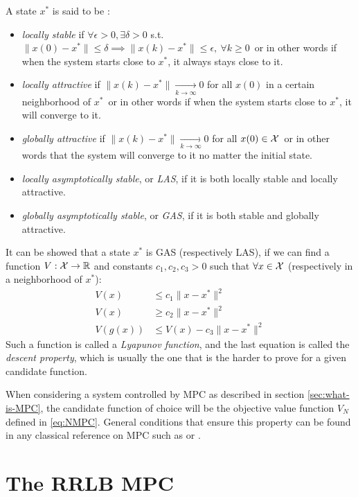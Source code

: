 \documentclass[12pt]{article}
\begin{document}
\noindent A state $x^*$ is said to be :
\begin{itemize}[label=\textbullet]
	\item \textit{locally stable} if $\forall\epsilon>0,\exists \delta>0$ s.t. $\|x(0)-x^*\|\leq\delta\implies\|x(k)-x^*\|\leq\epsilon,~\forall k\geq 0$\, or in other words if when the system starts close to $x^*$, it always stays close to it.
	\item \textit{locally attractive} if $\|x(k)-x^*\|\underset{k\to\infty}{\longrightarrow}0$ for all $x(0)$ in a certain neighborhood of $x^*$\, or in other words if when the system starts close to $x^*$, it will converge to it.
	\item \textit{globally attractive} if $\|x(k)-x^*\|\underset{k\to\infty}{\longrightarrow}0$ for all $x(0)\in\cal{X}$\, or in other words that the system will converge to it no matter the initial state.
	\item \textit{locally asymptotically stable}, or \textit{LAS}, if it is both locally stable and locally attractive.
	\item \textit{globally asymptotically stable}, or \textit{GAS}, if it is both stable and globally attractive.
\end{itemize}

It can be showed that a state $x^*$ is GAS (respectively LAS), if we can find a function $V:\cal{X}\to\R$ and constants $c_1,c_2,c_3>0$ such that $\forall x\in\cal{X}$ (respectively in a neighborhood of $x^*$):
\begin{align*}
	V(x)&\leq c_1\|x-x^*\|^2\\
	V(x)&\geq c_2\|x-x^*\|^2\\
	V(g(x))&\leq V(x)-c_3\|x-x^*\|^2
\end{align*}
Such a function is called a \textit{Lyapunov function}, and the last equation is called the \textit{descent property}, which is usually the one that is the harder to prove for a given candidate function.

\vspace{12pt}

When considering a system controlled by MPC as described in section \ref{sec:what-is-MPC}, the candidate function of choice will be the objective value function $V_N$ defined in \ref{eq:NMPC}.
General conditions that ensure this property can be found in any classical reference on MPC such as \cite{MPC-book} or \cite{MPC-book-2}.



\section{The RRLB MPC}\label{sec:RRLB-MPC}
\end{document}
